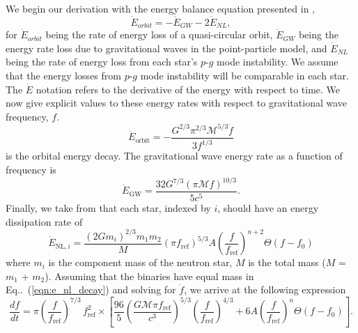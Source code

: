 We begin our derivation with the energy balance equation presented in \cite{Essick:2016tkn},
\begin{equation}\label{eqn_app:energy_bal}
\dot{E}_{orbit} = -\dot{E}_{GW} - 2 \dot{E}_{NL},
\end{equation}
for $\dot{E}_{orbit}$ being the rate of energy loss of a quasi-circular orbit, $\dot{E}_{GW}$ being the energy rate loss due to gravitational waves in the point-particle model, and $\dot{E}_{NL}$ being the rate of energy loss from each star's $p$-$g$ mode instability. We assume that the energy losses from $p$-$g$ mode instability will be comparable in each star. The $\dot{E}$ notation refers to the derivative of the energy with respect to time. We now give explicit values to these energy rates with respect to gravitational wave frequency, $f$.
\begin{equation}\label{eqn:e_orbit_decay}
\dot{E}_{\mathrm{orbit}} = - \frac{G^{2/3} \pi^{2/3} \mathcal{M}^{5/3} \dot{f}}{3 f^{1/3}}
\end{equation}
is the orbital energy decay. The gravitational wave energy rate as a function of frequency is
\begin{equation}\label{eqn:e_gw_decay}
\dot{E}_{\mathrm{GW}} = \frac{32 G^{7/3} \left(\pi \mathcal{M} f\right)^{10/3}}{5 c^5}.
\end{equation}
Finally, we take from \cite{Essick:2016tkn} that each star, indexed by $i$, should have an energy dissipation rate of
\begin{equation}\label{eqn:e_nl_decay}
\dot{E}_{\mathrm{NL}, i} = \frac{(2G m_i)^{2/3}m_1 m_2}{M} (\pi f_{\mathrm{ref}})^{5/3} A \left (\frac{f}{f_{\mathrm{ref}}} \right )^{n+2} \Theta(f - f_0) 
\end{equation}
where $m_i$ is the component mass of the neutron star, $M$ is the total mass ($M$ = $m_1$ + $m_2$). Assuming that the binaries have equal mass in Eq..~(\ref{eqn:e_nl_decay}) and solving for $\dot{f}$, we arrive at the following expression
\begin{equation}\label{eqn:f_dot}
\frac{df}{dt} =  \pi \left ( \frac{f}{f_{\mathrm{ref}}} \right )^{7/3} \, f_{\mathrm{ref}}^2 \times \left [ \frac{96}{5} \left ( \frac{G \mathcal{M} \pi f_{\mathrm{ref}}}{c^3}\right )^{5/3} \left (\frac{f}{f_{\mathrm{ref}}} \right )^{4/3} + 6 A \left (\frac{f}{f_{\mathrm{ref}}} \right )^{n} \Theta(f - f_0) \right ].
\end{equation}

